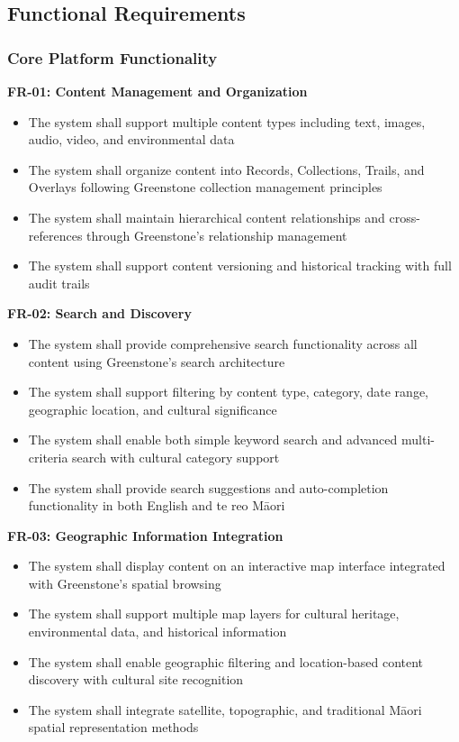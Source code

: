 \subsection{Functional Requirements}
\label{subsec:functional_requirements}

\subsubsection{Core Platform Functionality}
\label{subsubsec:core_functionality}

\textbf{FR-01: Content Management and Organization}
\begin{itemize}
    \item The system shall support multiple content types including text, images, audio, video, and environmental data
    \item The system shall organize content into Records, Collections, Trails, and Overlays following Greenstone collection management principles
    \item The system shall maintain hierarchical content relationships and cross-references through Greenstone's relationship management
    \item The system shall support content versioning and historical tracking with full audit trails
\end{itemize}

\textbf{FR-02: Search and Discovery}
\begin{itemize}
    \item The system shall provide comprehensive search functionality across all content using Greenstone's search architecture
    \item The system shall support filtering by content type, category, date range, geographic location, and cultural significance
    \item The system shall enable both simple keyword search and advanced multi-criteria search with cultural category support
    \item The system shall provide search suggestions and auto-completion functionality in both English and te reo M\=aori
\end{itemize}

\textbf{FR-03: Geographic Information Integration}
\begin{itemize}
    \item The system shall display content on an interactive map interface integrated with Greenstone's spatial browsing
    \item The system shall support multiple map layers for cultural heritage, environmental data, and historical information
    \item The system shall enable geographic filtering and location-based content discovery with cultural site recognition
    \item The system shall integrate satellite, topographic, and traditional M\=aori spatial representation methods
\end{itemize}

